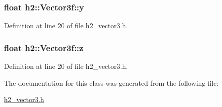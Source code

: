 \hypertarget{classh2_1_1_vector3f_ad8d143b9b36116553c41c76a4de569ff}{
\subsubsection[{y}]{\setlength{\rightskip}{0pt plus 5cm}float h2\-::\-Vector3f\-::y}}\label{classh2_1_1_vector3f_ad8d143b9b36116553c41c76a4de569ff}


Definition at line 20 of file h2\-\_\-vector3.\-h.

\hypertarget{classh2_1_1_vector3f_acea4aa4f8702625f04fb73cf4b4d7be5}{
\subsubsection[{z}]{\setlength{\rightskip}{0pt plus 5cm}float h2\-::\-Vector3f\-::z}}\label{classh2_1_1_vector3f_acea4aa4f8702625f04fb73cf4b4d7be5}


Definition at line 20 of file h2\-\_\-vector3.\-h.



The documentation for this class was generated from the following file\-:\begin{DoxyCompactItemize}
\item 
\hyperlink{h2__vector3_8h}{h2\-\_\-vector3.\-h}\end{DoxyCompactItemize}
